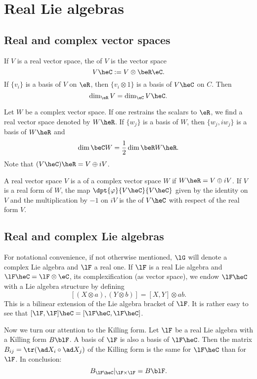\section{Real Lie algebras}

\subsection{Real and complex vector spaces}

If $V$ is a real vector space, the  of $V$ is the vector space
\[
	V\heC:=V\otimes\beR\eC.
\]
If $\{v_i\}$ is a basis of $V$ on $\eR$, then $\{v_i\otimes 1\}$ is a basis of $V\heC$ on $C$. Then
\[
	\dim_{\eR}V=\dim_{\eC}V\heC.
\]

Let $W$ be a complex vector space. If one restrains the scalars to $\eR$, we find a real vector space denoted by $W\heR$. If $\{w_j\}$ is a basis of $W$, then $\{w_j,iw_j\}$ is a basis of $W\heR$ and
\[
	\dim\beC W=\frac{1}{2}\dim\beR W\heR.
\]
Note that $(V\heC)\heR=V\oplus iV$.

A real vector space $V$ is a  of a complex vector space $W$ if $W\heR=V\oplus iV$. If $V$ is a real form of $W$, the map $\dpt{\varphi}{V\heC}{V\heC}$ given by the identity on $V$ and the multiplication by $-1$ on $iV$ is the  of $V\heC$ with respect of the real form $V$.

\subsection{Real and complex Lie algebras}

For notational convenience, if not otherwise mentioned, $\lG$ will denote a complex Lie algebra and $\lF$ a real one. If $\lF$ is a real Lie algebra and $\lF\heC=\lF\otimes\eC$, its complexification (as vector space), we endow $\lF\heC$ with a Lie algebra structure by defining
\[
	[ (X\otimes a),(Y\otimes b)  ]=[X,Y]\otimes ab.
\]
This is a bilinear extension of the Lie algebra bracket of $\lF$. It is rather easy to see that $[\lF,\lF]\heC=[\lF\heC,\lF\heC]$.

Now we turn our attention to the Killing form. Let $\lF$ be a real Lie algebra with a Killing form $B\blF$. A basis of $\lF$ is also a basis of $\lF\heC$. Then the matrix $B_{ij}=\tr( \ad X_i\circ\ad X_j )$ of the Killing form is the same for $\lF\heC$ than for $\lF$. In conclusion:
\[
	B_{\lF\heC}|_{\lF\times\lF}=B\blF.
\]

